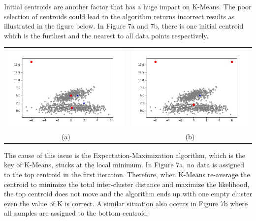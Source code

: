 \documentclass{article}
\begin{document}
Initial centroids are another factor that has a huge impact on K-Means. The poor selection of centroids could lead to the algorithm returns incorrect results as illustrated in the figure below. In Figure 7a and 7b, there is one initial centroid which is the furthest and the nearest to all data points respectively.\\

\begin{center}
\begin{tabular}{c c}
\includegraphics[scale=0.3]{one_furthest_centroid} &
\includegraphics[scale=0.3]{one_nearest_centroid} \\
\scriptsize (a) & \scriptsize (b)
\end{tabular}
\end{center}

The cause of this issue is the Expectation-Maximization algorithm, which is the key of K-Means, stucks at the local minimum. In Figure 7a, no data is assigned to the top centroid in the first iteration. Therefore, when K-Means re-average the centroid to minimize the total inter-cluster distance and maximize the likelihood, the top centroid does not move and the algorithm ends up with one empty cluster even the value of K is correct. A similar situation also occurs in Figure 7b where all samples are assigned to the bottom centroid.
\end{document}
